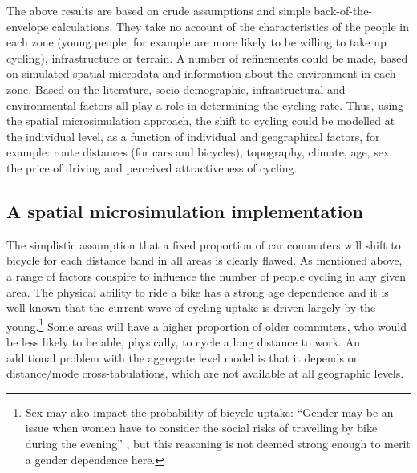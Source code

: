 The above results are based on crude assumptions and simple
back-of-the-envelope calculations. They take no account of the characteristics
of the people in each zone (young people, for example are more likely to be
willing to take up cycling), infrastructure or terrain. A number of refinements
could be made, based on simulated spatial microdata and information about the
environment in each zone. Based on the literature, socio-demographic,
infrastructural and environmental factors all play a role in determining the
cycling rate. Thus, using the spatial microsimulation approach, the shift to
cycling could be modelled at the individual level, as a function of
individual and geographical factors, for example:
route distances (for cars and bicycles), topography, climate, age, sex,
the price of driving and perceived attractiveness of cycling. 
\subsection{A spatial microsimulation implementation}
The simplistic assumption that a fixed proportion of car commuters will
shift to bicycle for each distance band in all areas is clearly flawed.
As mentioned above, a range of factors conspire to influence the number of
people cycling in any given area. The physical ability to ride a bike
has a strong age dependence and it is well-known that the current wave
of cycling uptake is driven largely by the
young.\footnote{Sex
may also impact the probability of bicycle uptake: ``Gender may be an issue when
women have to consider the social risks of travelling by bike during the
evening'' \citep[p.~532]{Rietveld2004}, but this reasoning is not deemed
strong enough to merit a gender dependence here.
}
Some areas will have a higher proportion of older commuters, who would
be less likely to be able, physically, to cycle a long distance to work.
An additional problem with the aggregate level model is that it depends
on distance/mode cross-tabulations, which are not available at all
geographic levels.

